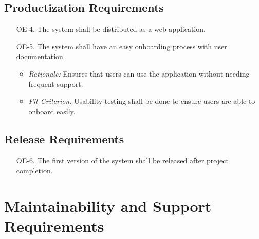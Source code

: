 \documentclass[12pt]{article}
\begin{document}
\subsection{Productization Requirements}
\begin{enumerate}
  \item[OE-4.] The system shall be distributed as a web application.
  \item[OE-5.] The system shall have an easy onboarding process with user documentation.
  \begin{itemize}
    \item \textit{Rationale:} Ensures that users can use the application without needing frequent support.
    \item \textit{Fit Criterion:} Usability testing shall be done to ensure users are able to onboard easily.
  \end{itemize}
\end{enumerate}

\subsection{Release Requirements}
\begin{enumerate}
  \item[OE-6.] The first version of the system shall be released after project completion.
\end{enumerate}

\section{Maintainability and Support Requirements}
\end{document}
